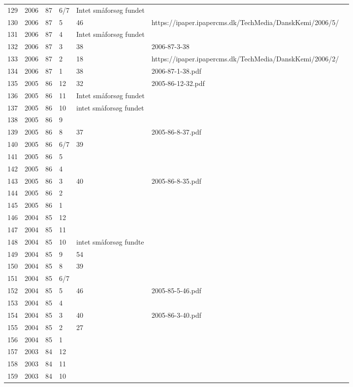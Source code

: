 \begin{longtable}{ |l|l|l|l|l|l|l| }
129 & 2006 & 87 & 6/7 & Intet småforsøg fundet &  &  \\
130 & 2006 & 87 & 5 & 46 & https://ipaper.ipapercms.dk/TechMedia/DanskKemi/2006/5/ &  \\
131 & 2006 & 87 & 4 & Intet småforsøg fundet &  &  \\
132 & 2006 & 87 & 3 & 38 & 2006-87-3-38 &  \\
133 & 2006 & 87 & 2 & 18 & https://ipaper.ipapercms.dk/TechMedia/DanskKemi/2006/2/ &  \\
134 & 2006 & 87 & 1 & 38 & 2006-87-1-38.pdf &  \\
135 & 2005 & 86 & 12 & 32 & 2005-86-12-32.pdf &  \\
136 & 2005 & 86 & 11 & Intet småforsøg fundet &  &  \\
137 & 2005 & 86 & 10 & intet småforsøg fundet &  &  \\
138 & 2005 & 86 & 9 &  &  &  \\
139 & 2005 & 86 & 8 & 37 & 2005-86-8-37.pdf &  \\
140 & 2005 & 86 & 6/7 & 39 &  &  \\
141 & 2005 & 86 & 5 &  &  &  \\
142 & 2005 & 86 & 4 &  &  &  \\
143 & 2005 & 86 & 3 & 40 & 2005-86-8-35.pdf &  \\
144 & 2005 & 86 & 2 &  &  &  \\
145 & 2005 & 86 & 1 &  &  &  \\
146 & 2004 & 85 & 12 &  &  &  \\
147 & 2004 & 85 & 11 &  &  &  \\
148 & 2004 & 85 & 10 & intet småforsøg fundte &  &  \\
149 & 2004 & 85 & 9 & 54 &  &  \\
150 & 2004 & 85 & 8 & 39 &  &  \\
151 & 2004 & 85 & 6/7 &  &  &  \\
152 & 2004 & 85 & 5 & 46 & 2005-85-5-46.pdf &  \\
153 & 2004 & 85 & 4 &  &  &  \\
154 & 2004 & 85 & 3 & 40 & 2005-86-3-40.pdf &  \\
155 & 2004 & 85 & 2 & 27 &  &  \\
156 & 2004 & 85 & 1 &  &  &  \\
157 & 2003 & 84 & 12 &  &  &  \\
158 & 2003 & 84 & 11 &  &  &  \\
159 & 2003 & 84 & 10 &  &  &  \\

\end{longtable}
